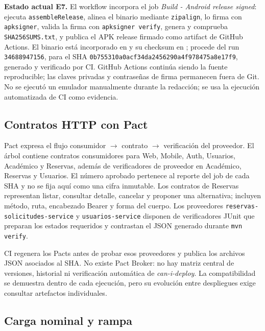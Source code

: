 \textbf{Estado actual E7.} El workflow incorpora el job \emph{Build - Android
release signed}: ejecuta \texttt{assembleRelease}, alinea el binario mediante
\texttt{zipalign}, lo firma con \texttt{apksigner}, valida la firma con
\texttt{apksigner verify}, genera y comprueba \texttt{SHA256SUMS.txt}, y publica
el APK release firmado como artifact de GitHub Actions. El binario está
incorporado en  y su checksum en
; procede del run \texttt{34688947156}, para el
SHA \texttt{0b755310a0acf34da2456290a4f978475a8e17f9}, generado y verificado por
CI. GitHub Actions continúa siendo la fuente reproducible; las claves privadas
y contraseñas de firma permanecen fuera de Git.
No se ejecutó un emulador manualmente durante la redacción; se usa la ejecución
automatizada de CI como evidencia.

\subsection{Contratos HTTP con Pact}
\label{subsec:pact}

Pact expresa el flujo consumidor $\rightarrow$ contrato $\rightarrow$
verificación del proveedor. El árbol contiene contratos consumidores para Web,
Mobile, Auth, Usuarios, Académico y Reservas, además de verificadores de
proveedor en Académico, Reservas y Usuarios. El número aprobado pertenece al
reporte del job de cada SHA y no se fija aquí como una cifra inmutable. Los contratos de
Reservas representan listar, consultar detalle, cancelar y proponer una
alternativa; incluyen método, ruta, encabezado Bearer y forma del cuerpo. Los
proveedores \texttt{reservas-solicitudes-service} y
\texttt{usuarios-service} disponen de verificadores JUnit que preparan los
estados requeridos y contrastan el JSON generado durante \texttt{mvn verify}.

CI regenera los Pacts antes de probar esos proveedores y publica los archivos
JSON asociados al SHA. No existe Pact Broker: no hay matriz central de versiones,
historial ni verificación automática de \emph{can-i-deploy}. La compatibilidad se
demuestra dentro de cada ejecución, pero su evolución entre despliegues exige
consultar artefactos individuales.

\subsection{Carga nominal y rampa}
\label{subsec:carga-locust}


